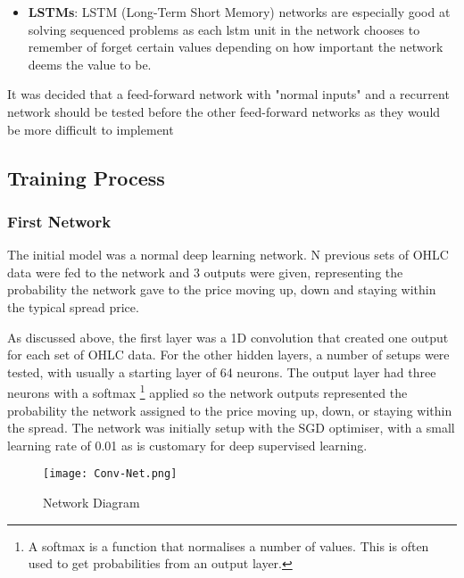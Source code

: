 \begin{itemize}
            \begin{itemize}

                \item \textbf{LSTMs}: LSTM (Long-Term Short Memory) networks are especially good at solving sequenced problems as each lstm unit in the network chooses to remember of forget certain values depending on how important the network deems the value to be.
                
            \end{itemize}

        \end{itemize}

        It was decided that a feed-forward network with "normal inputs" and a recurrent network should be tested before the other feed-forward networks as they would be more difficult to implement


        \subsection{Training Process}

            \subsubsection{First Network}
            The initial model was a normal deep learning network. N previous sets of OHLC data were fed to the network and 3 outputs were given, representing the probability the network gave to the price moving up, down and staying within the typical spread price.

            As discussed above, the first layer was a 1D convolution that created one output for each set of OHLC data. For the other hidden layers, a number of setups were tested, with usually a starting layer of 64 neurons. The output layer had three neurons with a softmax \footnote{A softmax is a function that normalises a number of values. This is often used to get probabilities from an output layer.} applied so the network outputs represented the probability the network assigned to the price moving up, down, or staying within the spread. The network was initially setup with the SGD optimiser, with a small learning rate of 0.01 as is customary for deep supervised learning.
            
            \begin{figure}[h]
                \centering
                \texttt{[image: Conv-Net.png]}
                \caption{Network Diagram}
                \label{fig:first_net_diagram}
            \end{figure}

